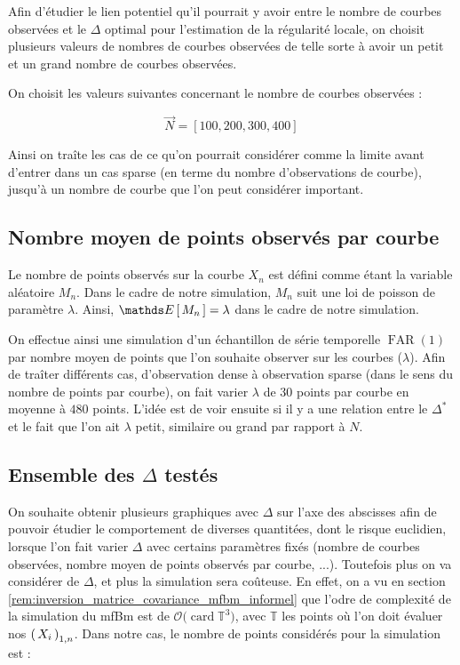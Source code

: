 Afin d'étudier le lien potentiel qu'il pourrait y avoir entre le nombre de courbes observées et le $\Delta$ optimal pour l'estimation de la régularité locale, on choisit plusieurs valeurs de nombres de courbes observées de telle sorte à avoir un \og petit \fg et un \og grand \fg nombre de courbes observées.

On choisit les valeurs suivantes concernant le nombre de courbes observées :

$$
	\vec N = [ 100, 200, 300, 400]
$$

Ainsi on traîte les cas de ce qu'on pourrait considérer comme la limite avant d'entrer dans un cas \og sparse \fg (en terme du nombre d'observations de courbe), jusqu'à un nombre de courbe que l'on peut considérer important.

\subsection{Nombre moyen de points observés par courbe}

Le nombre de points observés sur la courbe $X_n$ est défini comme étant la variable aléatoire $M_n$. Dans le cadre de notre simulation, $M_n$ suit une loi de poisson de paramètre $\lambda$. Ainsi, $\esperance{M_n} = \lambda$ dans le cadre de notre simulation.

On effectue ainsi une simulation d'un échantillon de série temporelle $\operatorname{FAR}(1)$ par nombre moyen de points que l'on souhaite observer sur les courbes ($\lambda$). Afin de traîter différents cas, d'observation \og dense \fg à observation \og sparse \fg (dans le sens du nombre de points par courbe), on fait varier $\lambda$ de $30$ points par courbe en moyenne à $480$ points. L'idée est de voir ensuite si il y a une relation entre le $\Delta^*$ et le fait que l'on ait $\lambda$ petit, similaire ou grand par rapport à $N$.

\subsection{Ensemble des $\Delta$ testés}

On souhaite obtenir plusieurs graphiques avec $\Delta$ sur l'axe des abscisses afin de pouvoir étudier le comportement de diverses quantitées, dont le risque euclidien, lorsque l'on fait varier $\Delta$ avec certains paramètres fixés (nombre de courbes observées, nombre moyen de points observés par courbe, ...). Toutefois plus on va considérer de $\Delta$, et plus la simulation sera coûteuse. En effet, on a vu en section \ref{rem:inversion_matrice_covariance_mfbm_informel} que l'odre de complexité de la simulation du mfBm est de $\mathcal O \bigl( \operatorname{card} \mathds T^3 \bigr)$, avec $\mathds T$ les points où l'on doit évaluer nos $\left( \, {X} _ {i} \, \right)_{1, n}$. Dans notre cas, le nombre de points considérés pour la simulation est :


